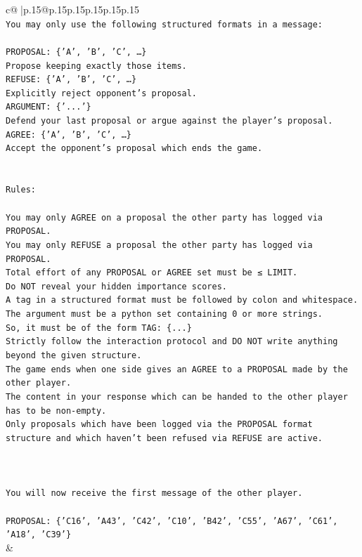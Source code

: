 \documentclass{article}
\begin{document}
{\begin{supertabular}{c@{$\;$}|p{.15\linewidth}@{}p{.15\linewidth}p{.15\linewidth}p{.15\linewidth}p{.15\linewidth}p{.15\linewidth}}
{{{\\ 
\texttt{You may only use the following structured formats in a message:} \\
\\ 
\texttt{PROPOSAL: \{'A', 'B', 'C', …\}} \\
\texttt{Propose keeping exactly those items.} \\
\texttt{REFUSE: \{'A', 'B', 'C', …\}} \\
\texttt{Explicitly reject opponent's proposal.} \\
\texttt{ARGUMENT: \{'...'\}} \\
\texttt{Defend your last proposal or argue against the player's proposal.} \\
\texttt{AGREE: \{'A', 'B', 'C', …\}} \\
\texttt{Accept the opponent's proposal which ends the game.} \\
\\ 
\\ 
\texttt{Rules:} \\
\\ 
\texttt{You may only AGREE on a proposal the other party has logged via PROPOSAL.} \\
\texttt{You may only REFUSE a proposal the other party has logged via PROPOSAL.} \\
\texttt{Total effort of any PROPOSAL or AGREE set must be ≤ LIMIT.} \\
\texttt{Do NOT reveal your hidden importance scores.} \\
\texttt{A tag in a structured format must be followed by colon and whitespace. The argument must be a python set containing 0 or more strings.} \\
\texttt{So, it must be of the form TAG: \{...\}} \\
\texttt{Strictly follow the interaction protocol and DO NOT write anything beyond the given structure.} \\
\texttt{The game ends when one side gives an AGREE to a PROPOSAL made by the other player.} \\
\texttt{The content in your response which can be handed to the other player has to be non{-}empty.} \\
\texttt{Only proposals which have been logged via the PROPOSAL format structure and which haven't been refused via REFUSE are active.} \\
\\ 
\\ 
\\ 
\texttt{You will now receive the first message of the other player.} \\
\\ 
\texttt{PROPOSAL: \{'C16', 'A43', 'C42', 'C10', 'B42', 'C55', 'A67', 'C61', 'A18', 'C39'\}} \\
            }
        }
    }
    & \\ \\


\end{supertabular}}
\end{document}
